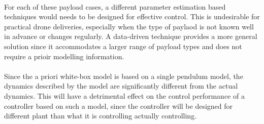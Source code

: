     \paragraph{}
    For each of these payload cases, a different parameter estimation based techniques would needs to be designed for effective control.
    This is undesirable for practical drone deliveries, especially when the type of paylaod is not known well in advance or changes regularly.
    A data-driven technique provides a more general solution since it accommodates a larger range of payload types and does not require a prioir modelling information.
        
    \paragraph{}
    Since the a priori white-box model is based on a single pendulum model, 
    the dynamics described by the model are significantly different from the actual dynamics.
    This will have a detrimental effect on the control performance of a controller based on such a model,
    since the controller will be designed for different plant than what it is controlling actually controlling.
       